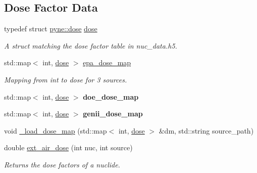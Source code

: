 \subsection*{Dose Factor Data}
\begin{DoxyCompactItemize}
\item 
\mbox{\label{namespacepyne_aa9e3ef3dda42a513b4b82e69fd32fc39}} 
typedef struct \hyperlink{structpyne_1_1dose}{pyne\+::dose} \hyperlink{namespacepyne_aa9e3ef3dda42a513b4b82e69fd32fc39}{dose}
\begin{DoxyCompactList}\small\item\em A struct matching the dose factor table in nuc\+\_\+data.\+h5. \end{DoxyCompactList}\item 
\mbox{\label{namespacepyne_ad1b097397cbd36054a6f38ebfe67f9df}} 
std\+::map$<$ int, \hyperlink{structpyne_1_1dose}{dose} $>$ \hyperlink{namespacepyne_ad1b097397cbd36054a6f38ebfe67f9df}{epa\+\_\+dose\+\_\+map}
\begin{DoxyCompactList}\small\item\em Mapping from int to dose for 3 sources. \end{DoxyCompactList}\item 
\mbox{\label{namespacepyne_a8f783225730796128e70a93c0c46574a}} 
std\+::map$<$ int, \hyperlink{structpyne_1_1dose}{dose} $>$ {\bfseries doe\+\_\+dose\+\_\+map}
\item 
\mbox{\label{namespacepyne_a976697aa130d69400c5b1ce918c77f5e}} 
std\+::map$<$ int, \hyperlink{structpyne_1_1dose}{dose} $>$ {\bfseries genii\+\_\+dose\+\_\+map}
\item 
void \hyperlink{namespacepyne_a61b4594d84a994be8189442991abdd42}{\+\_\+load\+\_\+dose\+\_\+map} (std\+::map$<$ int, \hyperlink{structpyne_1_1dose}{dose} $>$ \&dm, std\+::string source\+\_\+path)
\item 
double \hyperlink{namespacepyne_a01d3b4d7c1486b00dc025800d010f3c0}{ext\+\_\+air\+\_\+dose} (int nuc, int source)
\begin{DoxyCompactList}\small\item\em Returns the dose factors of a nuclide. \end{DoxyCompactList}\item 
\mbox{\label{namespacepyne_ab6717bdb001fad4f4cacaff218d974f1}} 

\end{DoxyCompactItemize}
